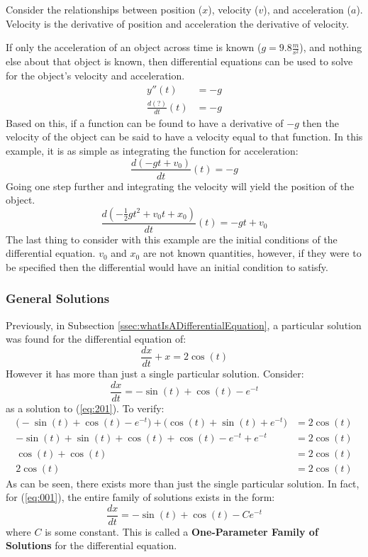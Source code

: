 \documentclass[12pt]{article}
\begin{document}
Consider the relationships between {\color{re} position} ($x$), {\color{gr} velocity} ($v$), and {\color{bl} acceleration} ($a$). Velocity is the derivative of position and acceleration the derivative of velocity.

If only the acceleration of an object across time is known ($g = 9.8 \frac{m}{s^2}$), and nothing else about that object is known, then differential equations can be used to solve for the object's velocity and acceleration.
\begin{align*}
  y''(t) &= -g \\
  \frac{d(?)}{dt}(t) &= -g
\end{align*}
Based on this, if a function can be found to have a derivative of $-g$ then the velocity of the object can be said to have a velocity equal to that function. In this example, it is as simple as integrating the function for acceleration:
\begin{equation*}
  \frac{d(-gt + v_0)}{dt}(t) = -g
\end{equation*}
Going one step further and integrating the velocity will yield the position of the object.
\begin{equation*}
  \frac{d\left(-\frac{1}{2}gt^2+v_0t+x_0\right)}{dt}(t) = -gt + v_0
\end{equation*}
The last thing to consider with this example are the initial conditions of the differential equation. $v_0$ and $x_0$ are not known quantities, however, if they were to be specified then the differential would have an initial condition to satisfy.

\subsubsection{General Solutions}
\label{sssec:generalSolutions}

Previously, in Subsection \ref{ssec:whatIsADifferentialEquation}, a particular solution was found for the differential equation of:
\begin{equation}
  \frac{dx}{dt} + x = 2 \cos(t)
  \label{eq:201}
\end{equation}
However it has more than just a single particular solution. Consider:
\begin{equation*}
  \frac{dx}{dt} = -\sin(t) + \cos(t) - e^{-t}
\end{equation*}
as a solution to (\ref{eq:201}). To verify:
\begin{align*}
  \big(-\sin(t) + \cos(t) - e^{-t}\big) + \big(\cos(t) + \sin(t) + e^{-t}\big) &= 2\cos(t) \\
  -\sin(t) + \sin(t) + \cos(t) + \cos(t) - e^{-t} + e^{-t} &= 2\cos(t) \\
  \cos(t) + \cos(t) &= 2\cos(t) \\
  2\cos(t) &= 2\cos(t)
\end{align*}
As can be seen, there exists more than just the single particular solution. In fact, for (\ref{eq:001}), the entire family of solutions exists in the form:
\begin{equation*}
  \frac{dx}{dt} = -\sin(t) + \cos(t) - Ce^{-t}
\end{equation*}
where $C$ is some constant. This is called a \textbf{One-Parameter Family of Solutions} for the differential equation.
\end{document}
